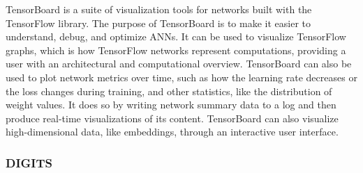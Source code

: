\begin{comment}
\textit{TensorBoard is a suite of visualization tools for TensorFlow programs. The purpose of TensorBoard is to make it easier to understand, debug, and optimize artificial neural networks. It can be used to visualize TensorFlow graphs, which is TensorFlow's way of representing computations. It can also be used to plot network metrics, such as how the learning rate varies over time, or how the loss function is changing. This is done by annotating the nodes of the graph with so called summary operations, that writes summary data to a log. TensorBoard then reads this log, in order to generate real-time visualizations. The visualizations are mostly restricted to plots, histograms and visualizations of the network architecture. However, it can also visualize high-dimensional data like embeddings, with a very interactive user interface. Functionality for writing to the TensorBoard log is also included in Keras, but only for the basic visualizations, and with limited customizability.}
\end{comment}

TensorBoard is a suite of visualization tools for networks built with the TensorFlow library. The purpose of TensorBoard is to make it easier to understand, debug, and optimize ANNs. It can be used to visualize TensorFlow graphs, which is how TensorFlow networks represent computations, providing a user with an architectural and computational overview. TensorBoard can also be used to plot network metrics over time, such as how the learning rate decreases or the loss changes during training, and other statistics, like the distribution of weight values. It does so by writing network summary data to a log and then produce real-time visualizations of its content. TensorBoard can also visualize high-dimensional data, like embeddings, through an interactive user interface.

\begin{comment}
Drawbacks:
- No managing of networks.
- No advanced visualizations.
\end{comment}

\subsubsection{DIGITS}

